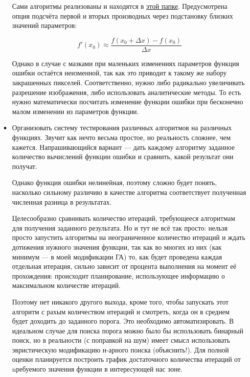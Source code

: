 \documentclass[11pt]{article}
\begin{document}
\begin{itemize}
                Сами алгоритмы реализованы и находятся в \href{https://github.com/donRumata03/PowerfulGA/blob/master/other_optimization/local_optimization.cpp}{этой папке}.
                Предусмотрена опция подсчёта первой и вторых производных через подстановку близких значений параметров:

                \begin{equation}
                    f'(x_0) \approx \frac{f(x_0 + \Delta x) - f(x_0)}{\Delta x}
                \end{equation}

                Однако в случае с мазками при маленьких изменениях параметров функция ошибки остаётся неизменной, так как это приводит к такому же набору закрашенных пикселей.
                Соответственно, нужно либо радикально увеличивать разрешение изображения, либо использовать аналитические методы.
                То есть нужно математически посчитать изменение функции ошибки при бесконечно малом изменении из параметров функции.

        \item \label{itm:testing_system} Организовать систему тестирования различных алгоритмов на различных функциях.
        Звучит как нечто весьма простое, но реальность сложнее, чем кажется.
        Напрашивающийся вариант — дать каждому алгоритму заданное количество вычислений функции ошибки и сравнить, какой результат они получат.

        Однако функция ошибки нелинейная, поэтому сложно будет понять,
        насколько сильному различию в качестве алгоритма соответствует полученная численная разница в результатах.

        Целесообразно сравнивать количество итераций, требующееся алгоритмам для получения заданного результата.
        Но и тут не всё так просто: нельзя просто запустить алгоритмы на неограниченное количество итераций
        и ждать дотижения нужного значения функции,
        так как во многих из них (как минимум — в моей модификации ГА) то,
        как будет проведена каждая отдельная итерация, сильно зависит от процента выполнения на момент её прохождения:
        происходит планирование,  использующее информацию о максимальном количестве итераций.


        Поэтому нет никакого другого выхода, кроме того, чтобы запускать этот алгоритм с рахым количеством итераций и смотреть, когда он в среднем будет доходить до заданного порога.
        Это необходимо автоматизировать.
        В идеальном случае для поиска порога можно было бы использовать бинарный поиск, но в реальности (с поправкой на шум) имеет смысл использовать эвристическую модификацию н-арного поиска (объяснить!).
        Для полной оценки планируется построить график достаточного количества итераций от nребуемого значения функции в интересующей нас зоне.


\end{itemize}
\end{document}

